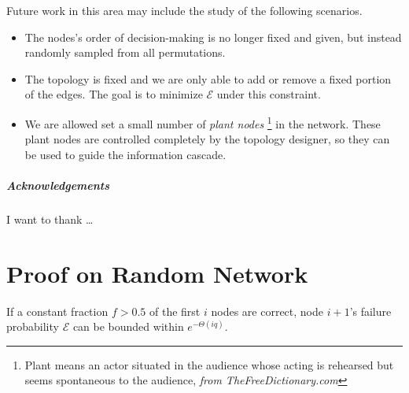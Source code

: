 \documentclass[a4paper,UKenglish]{lipics}
\theoremstyle{definition}
\begin{document}
Future work in this area may include the study of the following scenarios.
\begin{itemize}
\item The nodes's order of decision-making is no longer fixed and given, but instead randomly sampled from all permutations.
\item The topology is fixed and we are only able to add or remove a fixed portion of the edges.
		The goal is to minimize $\mathcal{E}$ under this constraint.
\item We are allowed set a small number of \emph{plant nodes}
	\footnote{Plant means an actor situated in the audience whose acting is rehearsed but seems spontaneous to the audience, 
	\emph{from TheFreeDictionary.com}} in the network.
	These plant nodes are controlled completely by the topology designer, so they can be used to guide the information cascade.
\end{itemize}









\subparagraph*{Acknowledgements}

I want to thank \dots









\clearpage
\appendix
\section{Proof on Random Network}
\label{sec:randomproof}

If a constant fraction $f > 0.5$ of the first $i$ nodes are correct, 
	node $i+1$'s failure probability $\mathcal{E}$ can be bounded within $e^{-\Theta(iq)}$. 
\end{document}
